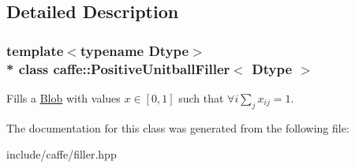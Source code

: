 \subsection{Detailed Description}
\subsubsection*{template$<$typename Dtype$>$\\*
class caffe\+::\+Positive\+Unitball\+Filler$<$ Dtype $>$}

Fills a \hyperlink{classcaffe_1_1Blob}{Blob} with values $ x \in [0, 1] $ such that $ \forall i \sum_j x_{ij} = 1 $. 

The documentation for this class was generated from the following file\+:\begin{DoxyCompactItemize}
\item 
include/caffe/filler.\+hpp\end{DoxyCompactItemize}
